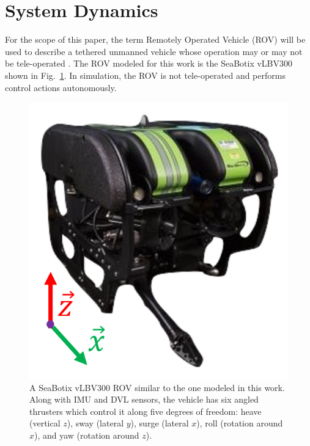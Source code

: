 \documentclass[letterpaper, 10 pt, conferences]{IEEEconf}  %
\begin{document}
\section{System Dynamics} 
\label{sec:dynamics}

For the scope of this paper, the term Remotely Operated Vehicle (ROV) will be used to describe a tethered unmanned vehicle whose operation may or may not be tele-operated \cite{ROV}. The ROV modeled for this work is the SeaBotix vLBV300 shown in Fig.~\ref{fig:seabotix}. In simulation, the ROV is not tele-operated and performs control actions autonomously.

\begin{figure}
\includegraphics[width=0.8\columnwidth]{images/volt}
\centering
\caption{A SeaBotix vLBV300 ROV similar to the one modeled in this work. Along with IMU and DVL sensors, the vehicle has six angled thrusters which control it along five degrees of freedom: heave (vertical $z$), sway (lateral $y$), surge (lateral $x$), roll (rotation around $x$), and yaw (rotation around $z$).}
\centering
\label{fig:seabotix}
\end{figure}
\end{document}
